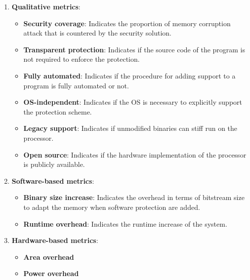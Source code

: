 \documentclass{book}
\begin{document}
			\begin{enumerate}
				\item \textbf{Qualitative metrics}:
				\begin{itemize}
					\item \textbf{Security coverage}: Indicates the proportion of memory corruption attack that is countered by the security solution.
					\item \textbf{Transparent protection}: Indicates if the source code of the program is not required to enforce the protection.
					\item \textbf{Fully automated}: Indicates if the procedure for adding support to a program is fully automated or not.
					\item \textbf{OS-independent}: Indicates if the OS is necessary to explicitly support the protection scheme.
					\item \textbf{Legacy support}: Indicates if unmodified binaries can stiff run on the processor.
					\item \textbf{Open source}: Indicates if the hardware implementation of the processor is publicly available.
				\end{itemize}
			
				\item \textbf{Software-based metrics}:
				\begin{itemize}
					\item \textbf{Binary size increase}: Indicates the overhead in terms of bitstream size to adapt the memory when software protection are added. 
					\item \textbf{Runtime overhead}: Indicates the runtime increase of the system.
				\end{itemize}
			
				\item \textbf{Hardware-based metrics}:
				\begin{itemize}
					\item \textbf{Area overhead}
					\item \textbf{Power overhead}
				\end{itemize}
			\end{enumerate}
		
			
		
	
	
\end{document}
